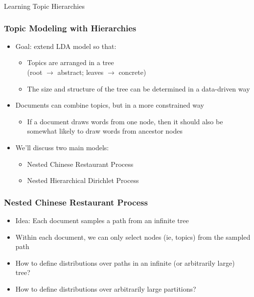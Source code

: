 \documentclass{beamer}
\newcommand{\customSectionFrame}[1]{%
  \begin{frame}[c]{ } %
  \Large
  \color[rgb]{0,0,0.6}
  \centering %
  #1 %
  \end{frame}%
  }
\begin{document}

\customSectionFrame{Learning Topic Hierarchies}

\begin{frame}
\frametitle{Topic Modeling with Hierarchies}
\begin{itemize}[<+->]
\item Goal: extend LDA model so that: %
    \begin{itemize}[<+->]
    \item Topics are arranged in a tree \\ (root $\rightarrow$ abstract; leaves $\rightarrow$ concrete)
    \item The size and structure of the tree can be determined in a data-driven way
    \end{itemize}
\item Documents can combine topics, but in a more constrained way
    \begin{itemize}
    \item If a document draws words from one node, then it should also be somewhat likely to draw words from ancestor nodes
    \end{itemize}
\item We'll discuss two main models:
    \begin{itemize}
    \item Nested Chinese Restaurant Process
    \item Nested Hierarchical Dirichlet Process
    \end{itemize}
\end{itemize}
\end{frame}

\begin{frame}
\frametitle{Nested Chinese Restaurant Process}
\begin{itemize}[<+->]
\item Idea: Each document samples a path from an infinite tree
\item Within each document, we can only select nodes (ie, topics) from the sampled path
\vspace{1em}
\item How to define distributions over paths in an infinite (or arbitrarily large) tree? \\
\item How to define distributions over arbitrarily large partitions? \\
\end{itemize}
\end{frame}
\end{document}
